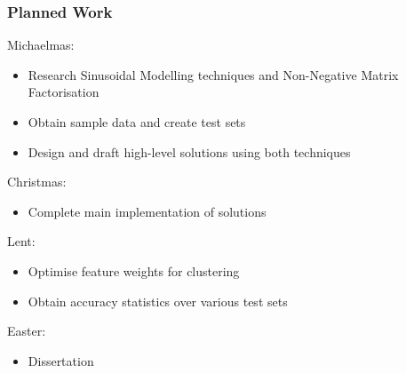 \documentclass{beamer}
\begin{document}
\begin{frame}

\frametitle{Planned Work}

Michaelmas:

\begin{itemize}
\item Research Sinusoidal Modelling techniques and Non-Negative Matrix Factorisation

\item Obtain sample data and create test sets

\item Design and draft high-level solutions using both techniques
\end{itemize}

Christmas:

\begin{itemize}
\item Complete main implementation of solutions
\end{itemize}

Lent:

\begin{itemize}
\item Optimise feature weights for clustering

\item Obtain accuracy statistics over various test sets
\end{itemize}

Easter:

\begin{itemize}
\item Dissertation
\end{itemize}

\end{frame}
\end{document}
